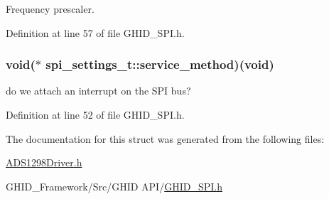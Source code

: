 \-Frequency prescaler. 



\-Definition at line 57 of file \-G\-H\-I\-D\-\_\-\-S\-P\-I.\-h.

\hypertarget{structspi__settings__t_a5c39f66eac994020a016c08dae03e71a}{
\subsubsection[{service\-\_\-method}]{\setlength{\rightskip}{0pt plus 5cm}void($\ast$ {\bf spi\-\_\-settings\-\_\-t\-::service\-\_\-method})(void)}}\label{structspi__settings__t_a5c39f66eac994020a016c08dae03e71a}


do we attach an interrupt on the \-S\-P\-I bus? 



\-Definition at line 52 of file \-G\-H\-I\-D\-\_\-\-S\-P\-I.\-h.



\-The documentation for this struct was generated from the following files\-:\begin{DoxyCompactItemize}
\item 
\hyperlink{_a_d_s1298_driver_8h}{\-A\-D\-S1298\-Driver.\-h}\item 
\-G\-H\-I\-D\-\_\-\-Framework/\-Src/\-G\-H\-I\-D A\-P\-I/\hyperlink{_g_h_i_d___s_p_i_8h}{\-G\-H\-I\-D\-\_\-\-S\-P\-I.\-h}\end{DoxyCompactItemize}
